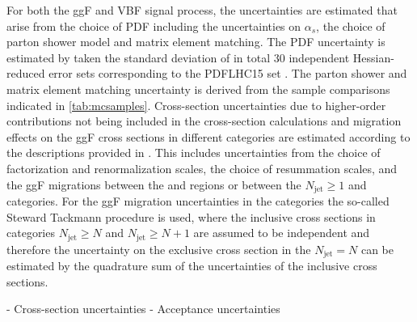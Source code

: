 For both the ggF and VBF signal process, the uncertainties are estimated that arise from the choice of PDF including the uncertainties on $\alpha_s$, the choice of parton shower model and matrix element matching.
The PDF uncertainty is estimated by taken the standard deviation of in total 30 independent Hessian-reduced error sets corresponding to the PDFLHC15 set \cite{Butterworth:2015oua}. 
The parton shower and matrix element matching uncertainty is derived from the sample comparisons indicated in \cref{tab:mcsamples}.
Cross-section uncertainties due to higher-order contributions not being included in the cross-section calculations and migration effects on the ggF cross sections in different \Njets categories are estimated according to the descriptions provided in .
This includes uncertainties from the choice of factorization and renormalization scales, the choice of resummation scales, and the ggF migrations between the \ZeroJet and \OneJet regions or between the $N_{\text{jet}} \ge 1$  and \TwoJet categories.
For the ggF migration uncertainties in the \TwoJet categories the so-called Steward Tackmann procedure is used, where the inclusive cross sections in categories $N_{\text{jet}} \ge N$ and $N_{\text{jet}} \ge N+1$ are assumed to be independent and therefore the uncertainty on the exclusive cross section in the $N_{\text{jet}} = N$ can be estimated by the quadrature sum of the uncertainties of the inclusive cross sections.



- Cross-section uncertainties
- Acceptance uncertainties


